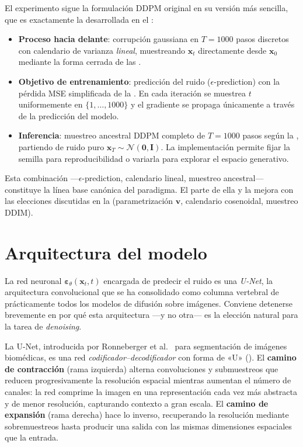 El experimento sigue la formulación DDPM original en su versión más
sencilla, que es exactamente la desarrollada en el
:

\begin{itemize}
    \item \textbf{Proceso hacia delante}: corrupción gaussiana en
    $T = 1000$ pasos discretos con calendario de varianza
    \emph{lineal}, muestreando $\mathbf{x}_t$ directamente desde
    $\mathbf{x}_0$ mediante la forma cerrada de las
    .
    \item \textbf{Objetivo de entrenamiento}: predicción del ruido
    ($\epsilon$-prediction) con la pérdida MSE simplificada de la
    . En cada iteración se muestrea $t$
    uniformemente en $\{1, \ldots, 1000\}$ y el gradiente se propaga
    únicamente a través de la predicción del modelo.
    \item \textbf{Inferencia}: muestreo ancestral DDPM completo de
    $T = 1000$ pasos según la , partiendo de
    ruido puro $\mathbf{x}_T \sim \mathcal{N}(\mathbf{0},
    \mathbf{I})$. La implementación permite fijar la semilla para
    reproducibilidad o variarla para explorar el espacio generativo.
\end{itemize}

Esta combinación —$\epsilon$-prediction, calendario lineal, muestreo
ancestral— constituye la línea base canónica del paradigma. El
 parte de ella y la mejora con las elecciones
discutidas en la  (parametrización
$\mathbf{v}$, calendario cosenoidal, muestreo DDIM).

\section{Arquitectura del modelo}
\label{sec:mariposas-arquitectura}

La red neuronal $\boldsymbol{\varepsilon}_\theta(\mathbf{x}_t, t)$
encargada de predecir el ruido es una \emph{U-Net}, la arquitectura
convolucional que se ha consolidado como columna vertebral de
prácticamente todos los modelos de difusión sobre imágenes. Conviene
detenerse brevemente en por qué esta arquitectura —y no otra— es la
elección natural para la tarea de \textit{denoising}.

La U-Net, introducida por Ronneberger et
al.~\cite{ronneberger2015unet} para segmentación de imágenes
biomédicas, es una red \emph{codificador--decodificador} con forma de
«U» (). El \textbf{camino de contracción} (rama
izquierda) alterna convoluciones y submuestreos que reducen
progresivamente la resolución espacial mientras aumentan el número de
canales: la red comprime la imagen en una representación cada vez más
abstracta y de menor resolución, capturando contexto a gran escala.
El \textbf{camino de expansión} (rama derecha) hace lo inverso,
recuperando la resolución mediante sobremuestreos hasta producir una
salida con las mismas dimensiones espaciales que la entrada.

